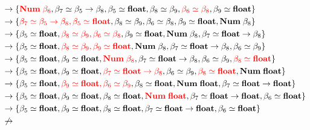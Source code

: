 \documentclass[12pt]{article}
\begin{document}
\begin{align*}
    &\to \{{\color{red} \mathbf{Num}\; \beta_6}, \beta_7 \simeq \beta_5 \to \beta_8, \beta_5 \simeq \mathbf{float}, \beta_8 \simeq \beta_9, {\color{red} \beta_6 \simeq \beta_8}, \beta_9 \simeq \mathbf{float}\} \\
    &\to \{{\color{red} \beta_7 \simeq \beta_5 \to \beta_8, \beta_5 \simeq \mathbf{float}}, \beta_8 \simeq \beta_9, \beta_6 \simeq \beta_8, \beta_9 \simeq \mathbf{float}, \mathbf{Num}\; \beta_8\} \\
    &\to \{\beta_5 \simeq \mathbf{float}, {\color{red} \beta_8 \simeq \beta_9, \beta_6 \simeq \beta_8}, \beta_9 \simeq \mathbf{float}, \mathbf{Num}\; \beta_8, \beta_7 \simeq \mathbf{float} \to \beta_8\} \\
    &\to \{\beta_5 \simeq \mathbf{float}, {\color{red} \beta_8 \simeq \beta_9, \beta_9 \simeq \mathbf{float}}, \mathbf{Num}\; \beta_8, \beta_7 \simeq \mathbf{float} \to \beta_8, \beta_6 \simeq \beta_9\} \\
    &\to \{\beta_5 \simeq \mathbf{float}, \beta_9 \simeq \mathbf{float}, {\color{red} \mathbf{Num}\; \beta_8}, \beta_7 \simeq \mathbf{float} \to \beta_8, \beta_6 \simeq \beta_9, {\color{red} \beta_8 \simeq \mathbf{float}}\} \\
    &\to \{\beta_5 \simeq \mathbf{float}, \beta_9 \simeq \mathbf{float}, {\color{red} \beta_7 \simeq \mathbf{float} \to \beta_8}, \beta_6 \simeq \beta_9, {\color{red} \beta_8 \simeq \mathbf{float}}, \mathbf{Num}\; \mathbf{float}\} \\
    &\to \{\beta_5 \simeq \mathbf{float}, {\color{red} \beta_9 \simeq \mathbf{float}, \beta_6 \simeq \beta_9}, \beta_8 \simeq \mathbf{float}, \mathbf{Num}\; \mathbf{float}, \beta_7 \simeq \mathbf{float} \to \mathbf{float}\} \\
    &\to \{\beta_5 \simeq \mathbf{float}, \beta_9 \simeq \mathbf{float}, \beta_8 \simeq \mathbf{float}, {\color{red} \mathbf{Num}\; \mathbf{float}}, \beta_7 \simeq \mathbf{float} \to \mathbf{float}, \beta_6 \simeq \mathbf{float}\} \\
    &\to \{\beta_5 \simeq \mathbf{float}, \beta_9 \simeq \mathbf{float}, \beta_8 \simeq \mathbf{float}, \beta_7 \simeq \mathbf{float} \to \mathbf{float}, \beta_6 \simeq \mathbf{float}\} \\
    &\not\to
\end{align*}
\end{document}
